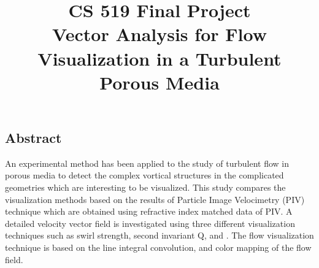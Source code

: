 \documentclass[letterpaper,12pt,titlepage,fleqn]{article}
\title{CS 519 Final Project\\Vector Analysis for Flow Visualization in a Turbulent Porous Media}
\author{\name}
\begin{document}
\maketitle

\setlength{\parindent}{2em} 

\begin{CJK}{UTF8}{gkai}

\section{Abstract}
An experimental method has been applied to the study of turbulent flow in porous media to detect the complex vortical structures in the complicated geometries  which are interesting to be visualized. This study compares the visualization methods based on the results of Particle Image Velocimetry (PIV) technique which are obtained using refractive index matched data of PIV. A detailed velocity vector field is investigated using three different visualization techniques such as swirl strength, second invariant Q, and . The flow visualization technique is based on the line integral convolution, and color mapping of the flow field. 

\end{CJK}
\end{document}
